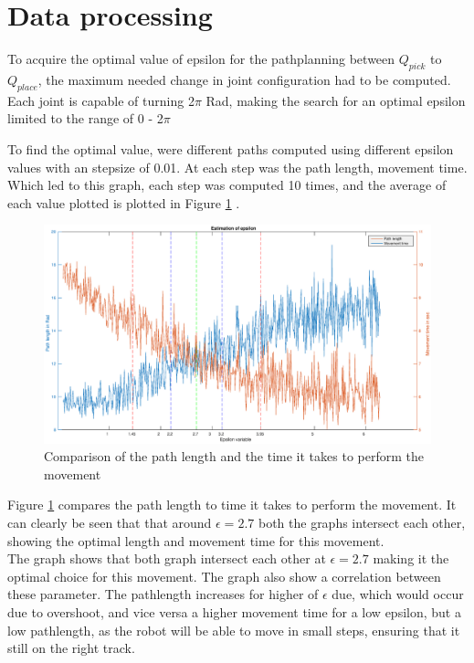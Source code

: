 \documentclass[11pt]{article}
\begin{document}
\section{Data processing}
To acquire the optimal value of epsilon for the pathplanning between $Q_{pick}$ to $Q_{place}$,  the maximum needed change in joint configuration had to be computed. Each joint is capable of turning 2$\pi$ Rad, making the search for an optimal epsilon limited to the range of 0 - 2$\pi$
 
 
\noindent To find the optimal value, were different paths computed using different epsilon values with an stepsize of 0.01.  At each step was the path length, movement time.   Which led to this graph, each step was computed 10 times, and the average of each value plotted is plotted in Figure \ref{fig::graph} .\\[0.2cm]

\begin{figure}[H]
\hspace{-3.5cm}\includegraphics[scale=0.55]{img/graph.eps}
\caption{Comparison of the path length and the time it takes to perform the movement}
\label{fig::graph}
\end{figure}

\noindent Figure \ref{fig::graph}  compares the path length  to time it takes to perform the movement.  It can clearly be seen that  that around $\epsilon = 2.7$  both the graphs intersect each other, showing the optimal length and movement time  for this movement. 
\\

The graph shows that both graph intersect each other at $\epsilon = 2.7$ making it the optimal choice for this movement.  The graph also show a correlation between these parameter.  The pathlength increases for higher of $\epsilon$ due, which would occur due to overshoot, and vice versa a higher movement time for a low epsilon, but a low pathlength, as the robot will be able to move in small steps, ensuring that it still on the right track. 
\end{document}

